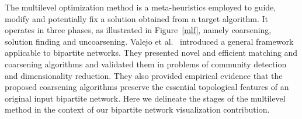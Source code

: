 \documentclass[runningheads]{llncs}
\begin{document}


The multilevel optimization method is a meta-heuristics employed to guide, modify and potentially fix a solution obtained from a target algorithm. 
It operates in three phases, as illustrated in Figure~\ref{mlf}, namely coarsening, solution finding and uncoarsening.
Valejo et al.~\cite{alan2} introduced a general framework applicable to bipartite networks. They presented novel and efficient matching and coarsening algorithms and validated them in problems of community detection and dimensionality reduction. They also provided empirical evidence that the proposed coarsening algorithms preserve the essential topological features of an original input bipartite network. Here we delineate the stages of the multilevel method in the context of our bipartite network visualization contribution.

\end{document}
